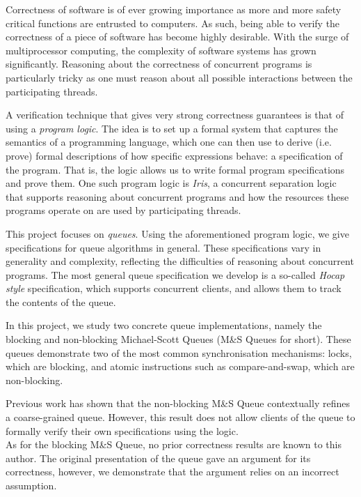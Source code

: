 \documentclass[a4paper, 10pt]{report}
\theoremstyle{definition}
\newcommand{\msq}{M\&S Queue}
\begin{document}
Correctness of software is of ever growing importance as more and more safety critical functions are entrusted to computers. As such, being able to verify the correctness of a piece of software has become highly desirable. With the surge of multiprocessor computing, the complexity of software systems has grown significantly. Reasoning about the correctness of concurrent programs is particularly tricky as one must reason about all possible interactions between the participating threads.

A verification technique that gives very strong correctness guarantees is that of using a \textit{program logic}. The idea is to set up a formal system that captures the semantics of a programming language, which one can then use to derive (i.e. prove) formal descriptions of how specific expressions behave: a specification of the program. That is, the logic allows us to write formal program specifications and prove them. One such program logic is \textit{Iris}, a concurrent separation logic that supports reasoning about concurrent programs and how the resources these programs operate on are used by participating threads.

This project focuses on \textit{queues}. Using the aforementioned program logic, we give specifications for queue algorithms in general. These specifications vary in generality and complexity, reflecting the difficulties of reasoning about concurrent programs. The most general queue specification we develop is a so-called \textit{Hocap style} specification, which supports concurrent clients, and allows them to track the contents of the queue.

In this project, we study two concrete queue implementations, namely the blocking and non-blocking Michael-Scott Queues (\msq{}s for short). These queues demonstrate two of the most common synchronisation mechanisms: locks, which are blocking, and atomic instructions such as compare-and-swap, which are non-blocking.

Previous work \citep{DBLP:conf/cpp/VindumB21} has shown that the non-blocking \msq{} contextually refines a coarse-grained queue. However, this result does not allow clients of the queue to formally verify their own specifications using the logic.\\
As for the blocking \msq{}, no prior correctness results are known to this author. The original presentation of the queue \citep{DBLP:conf/podc/MichaelS96} gave an argument for its correctness, however, we demonstrate that the argument relies on an incorrect assumption.
\end{document}
